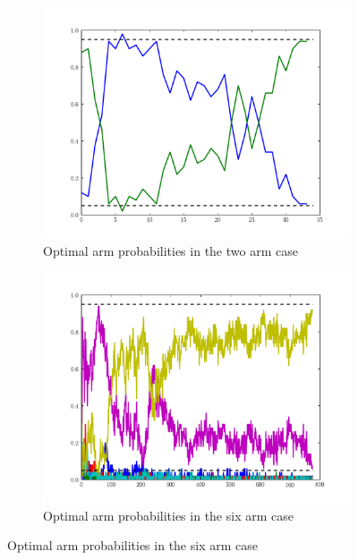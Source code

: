 \begin{figure}[h]
\centering
\begin{subfigure}[t]{.49\textwidth}
\centering
\includegraphics[width=\textwidth]{weights1.pdf}
\caption{Optimal arm probabilities in the two arm case}
\label{fig:weights1}
\end{subfigure}
\begin{subfigure}[t]{.49\textwidth}
\centering
\includegraphics[width=\textwidth]{weights2.pdf}
\caption{Optimal arm probabilities in the six arm case}
\label{fig:weights2}
\end{subfigure}
\end{figure}



